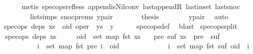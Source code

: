 \begin{isabellebody}
\ \ \ \ \ \ \isamarkupfalse%
\ {\isacharparenleft}metis\ spec{\isacharunderscore}ops{\isacharunderscore}ref{\isacharunderscore}less\ append{\isacharunderscore}is{\isacharunderscore}Nil{\isacharunderscore}conv\ last{\isacharunderscore}appendR\ last{\isacharunderscore}in{\isacharunderscore}set\ last{\isacharunderscore}snoc\isanewline
\ \ \ \ \ \ \ \ \ \ list{\isachardot}simps{\isacharparenleft}{}{\isacharparenright}\ snoc{\isachardot}prems{\isacharparenleft}{}{\isacharparenright}\ y{\isacharunderscore}pair{\isacharparenright}\isanewline
\ \ \ \ \isamarkupfalse%
\ \isamarkupfalse%
\ {\isacharquery}thesis\isanewline
\ \ \ \ \ \ \isamarkupfalse%
\ y{\isacharunderscore}pair\ \isamarkupfalse%
\ auto\isanewline
\ \ \isamarkupfalse%
\isanewline
\ \ \isamarkupfalse%
\ \isamarkupfalse%
\ {\isachardoublequoteopen}spec{\isacharunderscore}ops\ deps\ {\isacharparenleft}xs\ {\isacharat}\ {\isacharbrackleft}{\isacharparenleft}oid{\isacharcomma}\ oper{\isacharparenright}{\isacharbrackright}\ {\isacharat}\ ys\ {\isacharat}\ {\isacharbrackleft}y{\isacharbrackright}{\isacharparenright}{\isachardoublequoteclose}\isanewline
\ \ \ \ \isamarkupfalse%
\ spec{\isacharunderscore}ops{\isacharunderscore}def\ \isamarkupfalse%
\ blast\isanewline
{}\isamarkupfalse%
%
\endisatagproof
{\isafoldproof}%
%
\isadelimproof
\isanewline
%
\endisadelimproof
\isanewline
{}\isamarkupfalse%
\ spec{\isacharunderscore}ops{\isacharunderscore}split{\isacharcolon}\isanewline
\ \ \ {\isachardoublequoteopen}spec{\isacharunderscore}ops\ deps\ xs{\isachardoublequoteclose}\isanewline
\ \ \ \ \ {\isachardoublequoteopen}oid\ {\isasymnotin}\ set\ {\isacharparenleft}map\ fst\ xs{\isacharparenright}{\isachardoublequoteclose}\isanewline
\ \ \ {\isachardoublequoteopen}{\isasymexists}pre\ suf{\isachardot}\ xs\ {\isacharequal}\ pre\ {\isacharat}\ suf\ {\isasymand}\isanewline
\ \ \ \ \ \ \ \ \ \ \ \ {\isacharparenleft}{\isasymforall}i\ {\isasymin}\ set\ {\isacharparenleft}map\ fst\ pre{\isacharparenright}{\isachardot}\ i\ {\isacharless}\ oid{\isacharparenright}\ {\isasymand}\isanewline
\ \ \ \ \ \ \ \ \ \ \ \ {\isacharparenleft}{\isasymforall}i\ {\isasymin}\ set\ {\isacharparenleft}map\ fst\ suf{\isacharparenright}{\isachardot}\ oid\ {\isacharless}\ i{\isacharparenright}{\isachardoublequoteclose}\isanewline
%
\isadelimproof
%
\endisadelimproof

\end{isabellebody}
